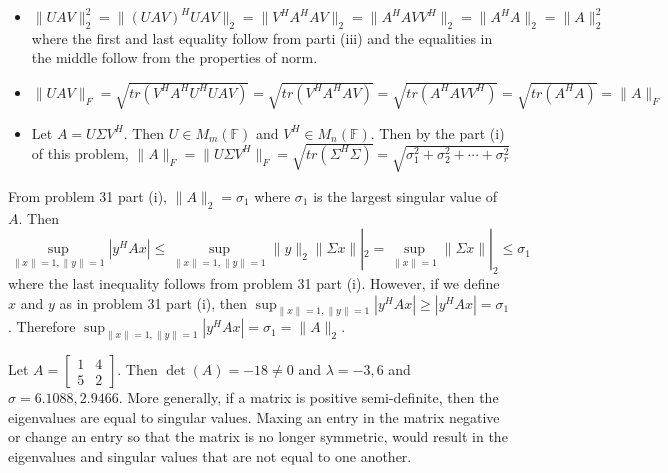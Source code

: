 \documentclass[12pt]{article}
\newcommand{\F}{\mathbb{F}}
\newenvironment{problem}[2][Problem]{\begin{trivlist}
\item[\hskip \labelsep {\bfseries #1}\hskip \labelsep {\bfseries #2}]}{\end{trivlist}}
\begin{document}
\begin{problem}{31.}
\begin{itemize}
\item [(iv)] $\|UAV\|^2_2 = \|(UAV)^HUAV\|_2 = \|V^HA^HAV\|_2 =  \|A^HAVV^H\|_2 = \|A^HA\|_2 = \|A\|^2_2$ where the first and last equality follow from parti (iii) and the equalities in the middle follow from the properties of norm. 
\end{itemize}
\end{problem}


\begin{problem}{32.}\hfill
\begin{itemize}
\item [(i)] $\| UAV\|_F = \sqrt{tr(V^HA^HU^HUAV)} = \sqrt{tr(V^HA^HAV)} =  \sqrt{tr(A^HAVV^H)}  = \sqrt{tr(A^HA)} = \|A\|_F $ 
\item [(ii)] Let $A = U\Sigma V^H$. Then $U \in M_m(\F)$ and $V^H \in M_n(\F)$. Then by the part (i) of this problem, $\|A\|_F = \| U\Sigma V^H\|_F = \sqrt{tr(\Sigma^H\Sigma)}  = \sqrt{\sigma_1^2 + \sigma_2^2 + \cdots + \sigma_r^2}$
\end{itemize}
\end{problem}

\begin{problem}{33.} 
From problem 31 part (i), $\|A\|_2 = \sigma_1$ where $\sigma_1$ is the largest singular value of $A$. Then 
$$\sup_{\|x\| = 1, \|y\| = 1} |y^HAx| \leq \sup_{\|x\| = 1, \|y\| = 1} \|y\|_2 \| \Sigma x\||_2  = \sup_{\|x\| = 1}\| \Sigma x\||_2 \leq \sigma_1$$
where the last inequality follows from problem 31 part (i). 
However, if we define $x$ and $y$ as in problem 31 part (i), then $\sup_{\|x\| = 1, \|y\| = 1} |y^HAx| \geq |y^HAx| = \sigma_1$. Therefore  $\sup_{\|x\| = 1, \|y\| = 1} |y^HAx| = \sigma_1 = \|A\|_2$. 
\end{problem}

\begin{problem}{36.} 
Let $A = \begin{bmatrix}
         1 & 4 \\
         5 & 2
        \end{bmatrix}$. Then $\det(A) = -18 \neq 0$ and $\lambda = -3, 6$ and $\sigma =  6.1088,  2.9466$. More generally, if a matrix is positive semi-definite, then the eigenvalues are equal to singular values. Maxing an entry in the matrix negative or change an entry so that the matrix is no longer symmetric, would result in the eigenvalues and singular values that are not equal to one another. 
        
\end{problem}
\end{document}
